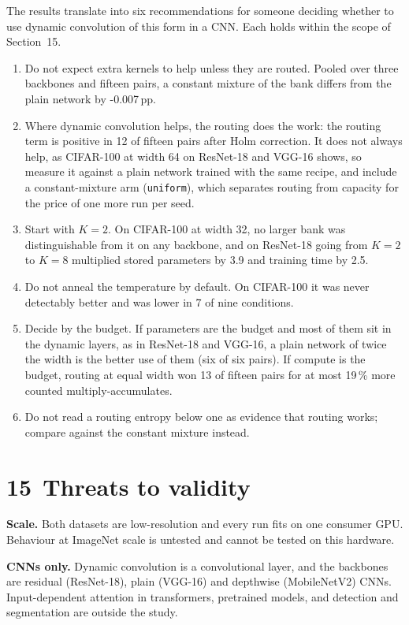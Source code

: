 \documentclass{article}
\begin{document}
The results translate into six recommendations for someone deciding
whether to use dynamic convolution of this form in a CNN. Each holds within
the scope of Section~15.
\begin{enumerate}
\item Do not expect extra kernels to help unless they are routed. Pooled
over three backbones and fifteen pairs, a constant mixture of the bank
differs from the plain network by -0.007\,pp.
\item Where dynamic convolution helps, the routing does the work: the
routing term is positive in 12 of fifteen pairs after Holm
correction. It does not always help, as CIFAR-100 at width 64 on ResNet-18
and VGG-16 shows, so measure it against a plain network trained with the
same recipe, and include a constant-mixture arm (\texttt{uniform}), which
separates routing from capacity for the price of one more run per seed.
\item Start with $K=2$. On CIFAR-100 at width 32, no larger bank was
distinguishable from it on any backbone, and on ResNet-18 going from $K=2$
to $K=8$ multiplied stored parameters by 3.9 and training time by
2.5.
\item Do not anneal the temperature by default. On CIFAR-100 it was never
detectably better and was lower in 7 of nine conditions.
\item Decide by the budget. If parameters are the budget and most of them
sit in the dynamic layers, as in ResNet-18 and VGG-16, a plain network of
twice the width is the better use of them (six of six pairs). If compute
is the budget, routing at equal width won 13 of fifteen pairs for
at most 19\,\% more counted multiply-accumulates.
\item Do not read a routing entropy below one as evidence that routing
works; compare against the constant mixture instead.
\end{enumerate}

\section*{15 Threats to validity}

\textbf{Scale.}  Both datasets are low-resolution and every run fits on
one consumer GPU. Behaviour at ImageNet scale is untested and cannot be
tested on this hardware.

\textbf{CNNs only.}  Dynamic convolution is a convolutional layer, and
the backbones are residual (ResNet-18), plain (VGG-16) and depthwise
(MobileNetV2) CNNs. Input-dependent attention in transformers, pretrained
models, and detection and segmentation are outside the study.
\end{document}
